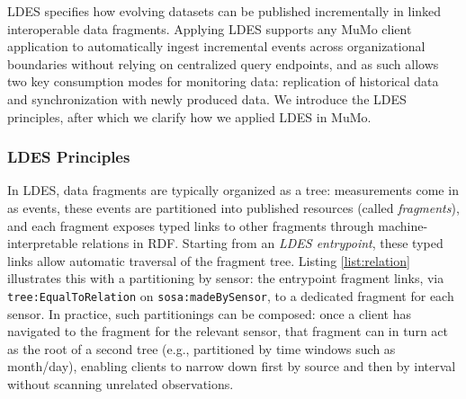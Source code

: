 \documentclass{ceurart}
\begin{document}
LDES specifies how evolving datasets can be published incrementally in
linked interoperable data fragments. Applying LDES supports any MuMo
client application to automatically ingest incremental events across
organizational boundaries without relying on centralized query
endpoints, and as such allows two key consumption modes for monitoring
data: replication of historical data and synchronization with newly
produced data. We introduce the LDES principles, after which we clarify
how we applied LDES in MuMo.

\subsubsection{LDES Principles}\label{ldes-principles}

In LDES, data fragments are typically organized as a tree: measurements
come in as events, these events are partitioned into published resources
(called \emph{fragments}), and each fragment exposes typed links to
other fragments through machine-interpretable relations in RDF. Starting
from an \emph{LDES entrypoint}, these typed links allow automatic
traversal of the fragment tree. Listing \ref{list:relation} illustrates
this with a partitioning by sensor: the entrypoint fragment links, via
\texttt{tree:EqualToRelation} on \texttt{sosa:madeBySensor}, to a
dedicated fragment for each sensor. In practice, such partitionings can
be composed: once a client has navigated to the fragment for the
relevant sensor, that fragment can in turn act as the root of a second
tree (e.g., partitioned by time windows such as month/day), enabling
clients to narrow down first by source and then by interval without
scanning unrelated observations.
\end{document}
